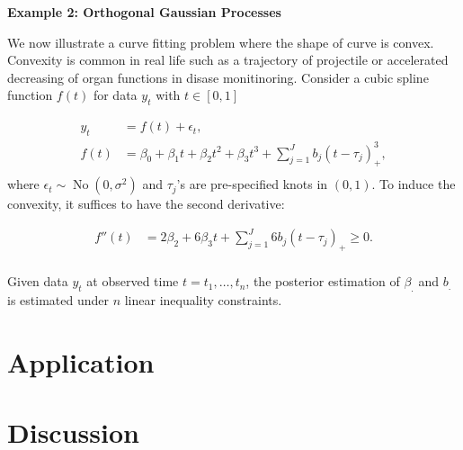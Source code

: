 \documentclass[10pt]{article}
\DeclareMathOperator{\No}{No}
\DeclareMathOperator{\1}{\mathbbm{1}}
\begin{document}
{\bf Example 2: Orthogonal Gaussian Processes}

We now illustrate a curve fitting problem where the shape of curve is convex. Convexity is common in real life such as a trajectory of projectile or accelerated decreasing of organ functions in disase monitinoring. Consider a cubic spline function $f(t)$ for data $y_t$ with $t\in [0,1]$


\begin{equation*}
\begin{aligned}
y_t & = f(t) + \epsilon_t,\\
f(t) & = \beta_0 + \beta_1 t + \beta_2 t^2+ \beta_3 t^3+ \sum_{j=1}^J b_j (t- \tau_j)^3_+,\\
\end{aligned}
\end{equation*}
where $\epsilon_t \sim \No(0, \sigma^2)$ and $\tau_j$'s are pre-specified knots in $(0,1)$. To induce the convexity, it suffices to have the second derivative:

\begin{equation*}
\begin{aligned}
f''(t) & =  2\beta_2 + 6\beta_3 t+ \sum_{j=1}^J 6b_j (t- \tau_j)_+ \ge 0.\\
\end{aligned}
\end{equation*}

Given data $y_t$ at observed time $t=t_1,\ldots, t_n$, the posterior estimation of $\beta_.$ and $b_.$ is estimated under $n$ linear inequality constraints.

\section{Application}
\section{Discussion}





\end{document}
